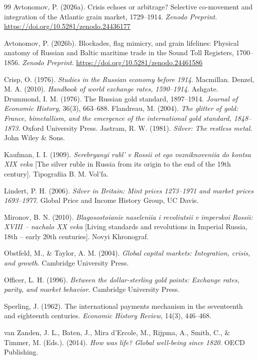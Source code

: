 \documentclass[11pt,a4paper]{article}
\begin{document}
\begin{thebibliography}{99}
Avtonomov, P. (2026a). Crisis echoes or arbitrage? Selective co-movement and integration of the Atlantic grain market, 1729--1914. \emph{Zenodo Preprint}. \url{https://doi.org/10.5281/zenodo.24436177}

Avtonomov, P. (2026b). Blockades, flag mimicry, and grain lifelines: Physical anatomy of Russian and Baltic maritime trade in the Sound Toll Registers, 1700--1856. \emph{Zenodo Preprint}. \url{https://doi.org/10.5281/zenodo.24461586}

Crisp, O. (1976). \emph{Studies in the Russian economy before 1914}. Macmillan.
Denzel, M. A. (2010). \emph{Handbook of world exchange rates, 1590--1914}. Ashgate.
Drummond, I. M. (1976). The Russian gold standard, 1897--1914. \emph{Journal of Economic History}, 36(3), 663--688.
Flandreau, M. (2004). \emph{The glitter of gold: France, bimetallism, and the emergence of the international gold standard, 1848--1873}. Oxford University Press.
Jastram, R. W. (1981). \emph{Silver: The restless metal}. John Wiley \& Sons.

Kaufman, I. I. (1909). \emph{Serebryanyi rubl' v Rossii ot ego vozniknoveniia do kontsa XIX veka} [The silver ruble in Russia from its origin to the end of the 19th century]. Tipografiia B. M. Vol'fa.

Lindert, P. H. (2006). \emph{Silver in Britain: Mint prices 1273--1971 and market prices 1693--1977}. Global Price and Income History Group, UC Davis.

Mironov, B. N. (2010). \emph{Blagosostoianie naseleniia i revoliutsii v imperskoi Rossii: XVIII -- nachalo XX veka} [Living standards and revolutions in Imperial Russia, 18th -- early 20th centuries]. Novyi Khronograf.

Obstfeld, M., \& Taylor, A. M. (2004). \emph{Global capital markets: Integration, crisis, and growth}. Cambridge University Press.

Officer, L. H. (1996). \emph{Between the dollar-sterling gold points: Exchange rates, parity, and market behavior}. Cambridge University Press.

Sperling, J. (1962). The international payments mechanism in the seventeenth and eighteenth centuries. \emph{Economic History Review}, 14(3), 446--468.

van Zanden, J. L., Baten, J., Mira d'Ercole, M., Rijpma, A., Smith, C., \& Timmer, M. (Eds.). (2014). \emph{How was life? Global well-being since 1820}. OECD Publishing.

\end{thebibliography}
\end{document}
